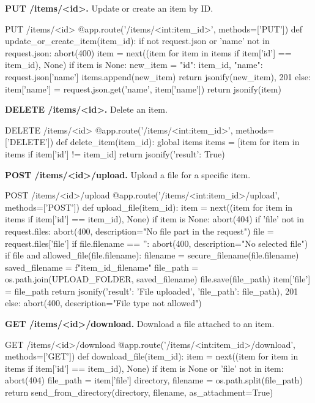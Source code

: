 {\bf PUT /items/<id>.} Update or create an item by ID.

\begin{codeonly}{PUT /items/<id>}
@app.route('/items/<int:item_id>', methods=['PUT'])
def update_or_create_item(item_id):
    if not request.json or 'name' not in request.json:
        abort(400)
    item = next((item for item in items if item['id'] == item_id), None)
    if item is None:
        new_item = {"id": item_id, "name": request.json['name']}
        items.append(new_item)
        return jsonify(new_item), 201
    else:
        item['name'] = request.json.get('name', item['name'])
        return jsonify(item)
\end{codeonly}

{\bf DELETE /items/<id>.} Delete an item.

\begin{codeonly}{DELETE /items/<id>}
@app.route('/items/<int:item_id>', methods=['DELETE'])
def delete_item(item_id):
    global items
    items = [item for item in items if item['id'] != item_id]
    return jsonify({'result': True})
\end{codeonly}

{\bf POST /items/<id>/upload.} Upload a file for a specific item.

\begin{codeonly}{POST /items/<id>/upload}
@app.route('/items/<int:item_id>/upload', methods=['POST'])
def upload_file(item_id):
    item = next((item for item in items if item['id'] == item_id), None)
    if item is None:
        abort(404)
    if 'file' not in request.files:
        abort(400, description="No file part in the request")
    file = request.files['file']
    if file.filename == '':
        abort(400, description="No selected file")
    if file and allowed_file(file.filename):
        filename = secure_filename(file.filename)
        saved_filename = f"{item_id}_{filename}"
        file_path = os.path.join(UPLOAD_FOLDER, saved_filename)
        file.save(file_path)
        item['file'] = file_path
        return jsonify({'result': 'File uploaded', 'file_path': file_path}), 201
    else:
        abort(400, description="File type not allowed")
\end{codeonly}

{\bf GET /items/<id>/download.} Download a file attached to an item.

\begin{codeonly}{GET /items/<id>/download}
@app.route('/items/<int:item_id>/download', methods=['GET'])
def download_file(item_id):
    item = next((item for item in items if item['id'] == item_id), None)
    if item is None or 'file' not in item:
        abort(404)
    file_path = item['file']
    directory, filename = os.path.split(file_path)
    return send_from_directory(directory, filename, as_attachment=True)
\end{codeonly}

